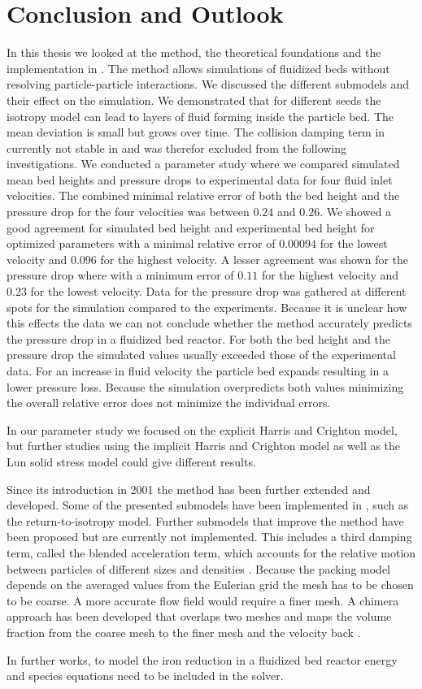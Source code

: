 \clearpage
\chapter{Conclusion and Outlook}

In this thesis we looked at the \MP method, the theoretical foundations and the implementation in \OFns.
The \MP method allows simulations of fluidized beds without resolving particle-particle interactions.
We discussed the different submodels and their effect on the simulation.
We demonstrated that for different seeds the isotropy model can lead to layers of fluid forming inside the particle bed. The mean deviation is small but grows over time. 
The collision damping term in currently not stable in \OF and was therefor excluded from the following investigations.
We conducted a parameter study where we compared simulated mean bed heights and pressure drops to experimental data for four fluid inlet velocities.
The combined minimal relative error of both the bed height and the pressure drop for the four velocities was between $0.24$ and $0.26$.
We showed a good agreement for simulated bed height and experimental bed height for optimized parameters with a minimal relative error of $0.00094$ for the lowest velocity and $0.096$ for the highest velocity.
A lesser agreement was shown for the pressure drop where with a minimum error of $0.11$ for the highest velocity and $0.23$ for the lowest velocity.
Data for the pressure drop was gathered at different spots for the simulation compared to the experiments. Because it is unclear how this effects the data we can not conclude whether the \MP method accurately predicts the pressure drop in a fluidized bed reactor.
For both the bed height and the pressure drop the simulated values usually exceeded those of the experimental data.
For an increase in fluid velocity the particle bed expands resulting in a lower pressure loss. Because the simulation overpredicts both values minimizing the overall relative error does not minimize the individual errors.


In our parameter study we focused on the explicit Harris and Crighton model, but further studies using the implicit Harris and Crighton model as well as the Lun solid stress model could give different results.

Since its introduction in 2001 the \MP method has been further extended and developed. 
Some of the presented submodels have been implemented in \OFns, such as the return-to-isotropy model.
Further submodels that improve the \MP method have been proposed but are currently not implemented.
This includes a third damping term, called the blended acceleration term, which accounts for the relative motion between particles of different sizes and densities \cite{thirdDamp}.
Because the packing model depends on the averaged values from the Eulerian grid the mesh has to be chosen to be coarse. A more accurate flow field would require a finer mesh. A chimera approach has been developed that overlaps two meshes and maps the volume fraction from the coarse mesh to the finer mesh and the velocity back \cite{chimera}.

In further works, to model the iron reduction in a fluidized bed reactor energy and species equations need to be included in the solver. 